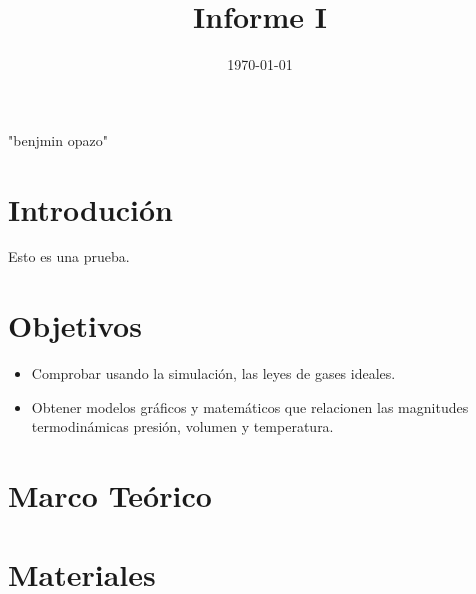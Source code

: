 \documentclass[]{article}
\title{Informe I}
\author{}
\date{\today}
\begin{document}
\maketitle  

"benjmin opazo"

\tableofcontents
\section{Introdución}
Esto es una prueba.



\section{Objetivos}
\begin{itemize}
    \item Comprobar usando la simulación, las leyes de gases ideales.
    \item Obtener modelos gráficos y matemáticos que relacionen las magnitudes termodinámicas presión,
    volumen y temperatura.
\end{itemize}


\section{Marco Teórico}




\section{Materiales}


\end{document}
